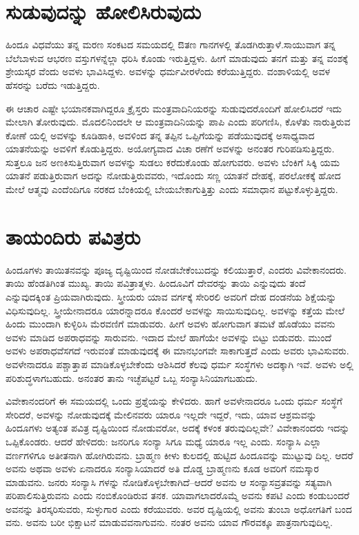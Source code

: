 \section{ಸುಡುವುದನ್ನು ಹೋಲಿಸಿರುವುದು}

ಹಿಂದೂ ವಿಧವೆಯು ತನ್ನ ಮರಣ ಸಂಕಟದ ಸಮಯದಲ್ಲಿ ಔತಣ ಗಾನಗಳಲ್ಲಿ ತೊಡಗಿರುತ್ತಾಳೆ.ಸಾಯುವಾಗ ತನ್ನ ಬೆಲೆಬಾಳುವ ಆಭರಣ ವಸ್ತುಗಳನ್ನೆಲ್ಲಾ ಧರಿಸಿ ಕೊಂಡು ಇರುತ್ತಿದ್ದಳು. ಹೀಗೆ ಮಾಡುವುದು ತನಗೆ ಮತ್ತು ತನ್ನ ವಂಶಕ್ಕೆ ಶ್ರೇಯಸ್ಕರ ವೆಂದು ಅವಳು ಭಾವಿಸಿದ್ದಳು. ಅವಳನ್ನು ಧರ್ಮವೀರಳೆಂದು ಕರೆಯುತ್ತಿದ್ದರು. ವಂಶಾಳಿಯಲ್ಲಿ ಅವಳ ಹೆಸರನ್ನು ಬರೆದು ಇಡುತ್ತಿದ್ದರು.

ಈ ಆಚಾರ ಎಷ್ಟೇ ಭಯಾನಕವಾಗಿದ್ದರೂ ಕ್ರೈಸ್ತರು ಮಂತ್ರವಾದಿನಿಯರನ್ನು ಸುಡುವುದರೊಂದಿಗೆ ಹೋಲಿಸಿದರೆ ಇದು ಮೇಲಾಗಿ ತೋರುವುದು. ಮೊದಲಿನಿಂದಲೇ ಆ ಮಂತ್ರವಾದಿನಿಯನ್ನು ಪಾಪಿ ಎಂದು ಪರಿಗಣಿಸಿ, ಕೊಳೆತು ನಾರುತ್ತಿರುವ ಕೋಣೆ ಯಲ್ಲಿ ಅವಳನ್ನು ಕೂಡಿಹಾಕಿ, ಅವಳಿಂದ ತನ್ನ ತಪ್ಪಿನ ಒಪ್ಪಿಗೆಯನ್ನು ಪಡೆಯುವುದಕ್ಕೆ ಅಸಾಧ್ಯವಾದ ಯಾತನೆಯನ್ನು ಅವಳಿಗೆ ಕೊಡುತ್ತಿದ್ದರು. ಅಯೋಗ್ಯವಾದ ವಿಚಾ ರಣೆಗೆ ಅವಳನ್ನು ಅನಂತರ ಗುರಿಪಡಿಸುತ್ತಿದ್ದರು. ಸುತ್ತಲೂ ಜನ ಅಣಕಿಸುತ್ತಿರುವಾಗ ಅವಳನ್ನು ಸುಡಲು ಕರೆದುಕೊಂಡು ಹೋಗುವರು. ಅವಳು ಬೆಂಕಿಗೆ ಸಿಕ್ಕಿ ಯಮ ಯಾತನೆ ಪಡುತ್ತಿರುವಾಗ ಅದನ್ನು ನೋಡುತ್ತಿರುವವರು, ಇದೊಂದು ಸಣ್ಣ ಯಾತನೆ ದೇಹಕ್ಕೆ, ಪರಲೋಕಕ್ಕೆ ಹೋದ ಮೇಲೆ ಆತ್ಮವು ಎಂದೆಂದಿಗೂ ನರಕದ ಬೆಂಕಿಯಲ್ಲಿ ಬೇಯಬೇಕಾಗುತ್ತಿತ್ತು ಎಂದು ಸಮಾಧಾನ ಪಟ್ಟುಕೊಳ್ಳುತ್ತಿದ್ದರು.

\delimiter


\section{ತಾಯಂದಿರು ಪವಿತ್ರರು}

ಹಿಂದೂಗಳು ತಾಯಿತನವನ್ನು ಪೂಜ್ಯ ದೃಷ್ಟಿಯಿಂದ ನೋಡಬೇಕೆಂಬುದನ್ನು ಕಲಿಯುತ್ತಾರೆ, ಎಂದರು ವಿವೇಕಾನಂದರು. ತಾಯಿ ಹೆಂಡತಿಗಿಂತ ಮುಖ್ಯ. ತಾಯಿ ಪವಿತ್ರಾತ್ಮಳು. ಹಿಂದೂವಿಗೆ ದೇವರನ್ನು ತಾಯಿ ಎನ್ನುವುದು ತಂದೆ ಎನ್ನುವುದಕ್ಕಿಂತ ಪ್ರಿಯವಾಗಿರುವುದು. ಸ್ತ್ರೀಯರು ಯಾವ ವರ್ಗಕ್ಕೆ ಸೇರಿರಲಿ ಅವರಿಗೆ ದೇಹ ದಂಡನೆಯ ಶಿಕ್ಷೆಯನ್ನು ವಿಧಿಸುವುದಿಲ್ಲ. ಸ್ತ್ರೀಯೇನಾದರೂ ಯಾರನ್ನಾದರೂ ಕೊಂದರೆ ಅವಳನ್ನು ಸಾಯಿಸುವುದಿಲ್ಲ. ಅವಳನ್ನು ಕತ್ತೆಯ ಮೇಲೆ ಹಿಂದು ಮುಂದಾಗಿ ಕುಳ್ಳಿರಿಸಿ ಮೆರವಣಿಗೆ ಮಾಡುವರು. ಹೀಗೆ ಅವಳು ಹೋಗುವಾಗ ತಮಟೆ ಹೊಡೆಯು ವವನು ಅವಳು ಮಾಡಿದ ಅಪರಾಧವನ್ನು ಸಾರುವನು. ಇದಾದ ಮೇಲೆ ಹಾಗೆಯೇ ಅವಳನ್ನು ಬಿಟ್ಟು ಬಿಡುವರು. ಮುಂದೆ ಅವಳು ಅಪರಾಧವೆಸಗದೆ ಇರುವಂತೆ ಮಾಡುವುದಕ್ಕೆ ಈ ಮಾನಭಂಗವೇ ಸಾಕಾಗುತ್ತದೆ ಎಂದು ಅವರು ಭಾವಿಸುವರು. ಅವಳೇನಾದರೂ ಪಶ್ಚಾತ್ತಾಪ ಮಾಡಿಕೊಳ್ಳಬೇಕೆಂದು ಆಶಿಸಿದರೆ ಕೆಲವು ಧರ್ಮ ಸಂಸ್ಥೆಗಳು ಅದಕ್ಕಾಗಿ ಇವೆ. ಅವಳು ಅಲ್ಲಿ ಪರಿಶುದ್ಧಳಾಗಬಹುದು. ಅನಂತರ ತಾನು ಇಚ್ಛೆಪಟ್ಟರೆ ಒಬ್ಬ ಸಂನ್ಯಾಸಿನಿಯಾಗಬಹುದು.

ವಿವೇಕಾನಂದರಿಗೆ ಈ ಸಮಯದಲ್ಲಿ ಒಂದು ಪ್ರಶ್ನೆಯನ್ನು ಕೇಳಿದರು. ಹಾಗೆ ಅವಳೇನಾದರೂ ಒಂದು ಧರ್ಮ ಸಂಸ್ಥೆಗೆ ಸೇರಿದರೆ, ಅವಳನ್ನು ನೋಡುವುದಕ್ಕೆ ಮೇಲಿನವರು ಯಾರೂ ಇಲ್ಲದೇ ಇದ್ದರೆ, ಇದು, ಯಾವ ಆಶ್ರಮವನ್ನು ಹಿಂದೂಗಳು ಅತ್ಯಂತ ಪವಿತ್ರ ದೃಷ್ಟಿಯಿಂದ ನೋಡುವರೋ, ಅದಕ್ಕೆ ಕಳಂಕ ತರುವುದಿಲ್ಲವೇ? ವಿವೇಕಾನಂದರು ಇದನ್ನು ಒಪ್ಪಿಕೊಂಡರು. ಆದರೆ ಹೇಳಿದರು: ಜನರಿಗೂ ಸಂನ್ಯಾ ಸಿಗೂ ಮಧ್ಯೆ ಯಾರೂ ಇಲ್ಲ ಎಂದು. ಸಂನ್ಯಾಸಿ ಎಲ್ಲಾ ವರ್ಣಗಳಿಗೂ ಅತೀತನಾಗಿ ಹೋಗಿರುವನು. ಬ್ರಾಹ್ಮಣ ಕೀಳು ಕುಲದಲ್ಲಿ ಹುಟ್ಟಿದ ಹಿಂದೂವನ್ನು ಮುಟ್ಟುವು ದಿಲ್ಲ. ಆದರೆ ಅವನು ಅಥವಾ ಅವಳು ಏನಾದರೂ ಸಂನ್ಯಾಸಿಯಾದರೆ ಅತಿ ದೊಡ್ಡ ಬ್ರಾಹ್ಮಣನು ಕೂಡ ಅವರಿಗೆ ನಮಸ್ಕಾರ ಮಾಡುವನು. ಜನರು ಸಂನ್ಯಾಸಿ ಗಳನ್ನು ನೋಡಿಕೊಳ್ಳಬೇಕಾಗಿದೆ–ಆದರೆ ಅವನು ಆ ಸಂನ್ಯಾಸವ್ರತವನ್ನು ಸತ್ಯವಾಗಿ ಪರಿಪಾಲಿಸುತ್ತಿರುವನು ಎಂದು ನಂಬಿಕೊಂಡಿರುವ ತನಕ. ಯಾವಾಗಲಾದರೊಮ್ಮೆ ಅವನು ಕಪಟಿ ಎಂದು ಕಂಡುಬಂದರೆ ಅವನನ್ನು ತಿರಸ್ಕರಿಸುವರು, ಸುಳ್ಳುಗಾರ ಎಂದು ಕರೆಯುವರು. ಅವರ ದೃಷ್ಟಿಯಲ್ಲಿ ಅವನು ತುಂಬಾ ಅಧೋಗತಿಗೆ ಬಂದ ವನು. ಅವನು ಬರೀ ಭಿಕ್ಷಾಟನೆ ಮಾಡುವವನಾಗುವನು. ನಂತರ ಅವನು ಯಾವ ಗೌರವಕ್ಕೂ ಪಾತ್ರನಾಗುವುದಿಲ್ಲ.


